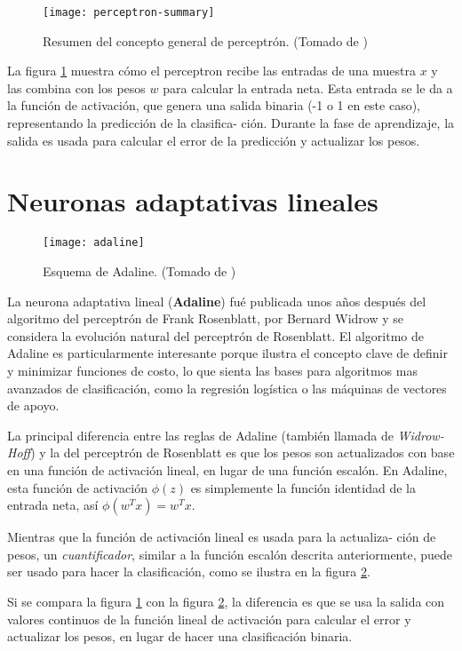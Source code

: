 \begin{figure}[H]
  \texttt{[image: perceptron-summary]} \centering
  \caption{Resumen del concepto general de perceptrón. (Tomado de
    \cite{python})}
  \label{fig:perceptron}
\end{figure}

La figura \ref{fig:perceptron} muestra cómo el perceptron recibe las
entradas de una muestra $x$ y las combina con los pesos $w$ para
calcular la entrada neta.  Esta entrada se le da a la función de
activación, que genera una salida binaria (-1 o 1 en este caso),
representando la predicción de la clasifica- ción. Durante la fase de
aprendizaje, la salida es usada para calcular el error de la
predicción y actualizar los pesos.

\section{Neuronas adaptativas lineales}

\begin{figure}[H]
  \texttt{[image: adaline]} \centering
  \caption{Esquema de Adaline. (Tomado de \cite{python})}
  \label{fig:adaline}
\end{figure}

La neurona adaptativa lineal (\textbf{Adaline}) fué publicada unos
años después del algoritmo del perceptrón de Frank Rosenblatt, por
Bernard Widrow \cite{adaline} y se considera la evolución natural del
perceptrón de Rosenblatt.  El algoritmo de Adaline es particularmente
interesante porque ilustra el concepto clave de definir y minimizar
funciones de costo, lo que sienta las bases para algoritmos mas
avanzados de clasificación, como la regresión logística o las máquinas
de vectores de apoyo.

La principal diferencia entre las reglas de Adaline (también llamada
de \textit{Widrow-Hoff}) y la del perceptrón de Rosenblatt es que los
pesos son actualizados con base en una función de activación lineal,
en lugar de una función escalón. En Adaline, esta función de
activación $\phi (z)$ es simplemente la función identidad de la
entrada neta, así $\phi (w^T x) = w^T x$.

Mientras que la función de activación lineal es usada para la
actualiza- ción de pesos, un \textit{cuantificador}, similar a la
función escalón descrita anteriormente, puede ser usado para hacer la
clasificación, como se ilustra en la figura \ref{fig:adaline}.

Si se compara la figura \ref{fig:perceptron} con la figura
\ref{fig:adaline}, la diferencia es que se usa la salida con valores
continuos de la función lineal de activación para calcular el error y
actualizar los pesos, en lugar de hacer una clasificación binaria.

